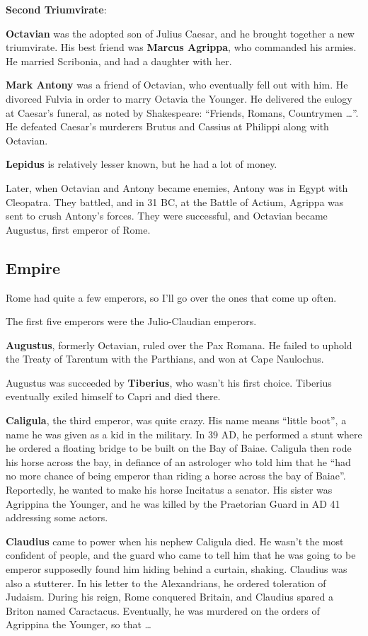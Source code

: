 \textbf{Second Triumvirate}:

\textbf{Octavian} was the adopted son of Julius Caesar, and he brought together a new triumvirate.
His best friend was \textbf{Marcus Agrippa}, who commanded his armies.
He married Scribonia, and had a daughter with her.

\textbf{Mark Antony} was a friend of Octavian, who eventually fell out with him.
He divorced Fulvia in order to marry Octavia the Younger.
He delivered the eulogy at Caesar's funeral, as noted by Shakespeare:
``Friends, Romans, Countrymen \ldots''.
He defeated Caesar's murderers Brutus and Cassius at Philippi along with Octavian.

\textbf{Lepidus} is relatively lesser known, but he had a lot of money.

Later, when Octavian and Antony became enemies, Antony was in Egypt with Cleopatra.
They battled, and in 31 BC, at the Battle of Actium, Agrippa was sent to crush Antony's forces.
They were successful, and Octavian became Augustus, first emperor of Rome.

\subsection*{Empire}

Rome had quite a few emperors, so I'll go over the ones that come up often.

The first five emperors were the Julio-Claudian emperors.

\textbf{Augustus}, formerly Octavian, ruled over the Pax Romana.
He failed to uphold the Treaty of Tarentum with the Parthians, and won at Cape Naulochus.

Augustus was succeeded by \textbf{Tiberius}, who wasn't his first choice.
Tiberius eventually exiled himself to Capri and died there.

\textbf{Caligula}, the third emperor, was quite crazy.
His name means ``little boot'', a name he was given as a kid in the military.
In 39 AD, he performed a stunt where he ordered a floating bridge to be built on the Bay of Baiae.
Caligula then rode his horse across the bay, in defiance of an astrologer who told him that he
``had no more chance of being emperor than riding a horse across the bay of Baiae''.
Reportedly, he wanted to make his horse Incitatus a senator.
His sister was Agrippina the Younger, and he was killed by the Praetorian Guard in AD 41 addressing some actors.

\textbf{Claudius} came to power when his nephew Caligula died.
He wasn't the most confident of people, and the guard who came to tell
him that he was going to be emperor supposedly found him hiding behind a curtain, shaking.
Claudius was also a stutterer.
In his letter to the Alexandrians, he ordered toleration of Judaism.
During his reign, Rome conquered Britain, and Claudius spared a Briton named Caractacus.
Eventually, he was murdered on the orders of Agrippina the Younger, so that \ldots

